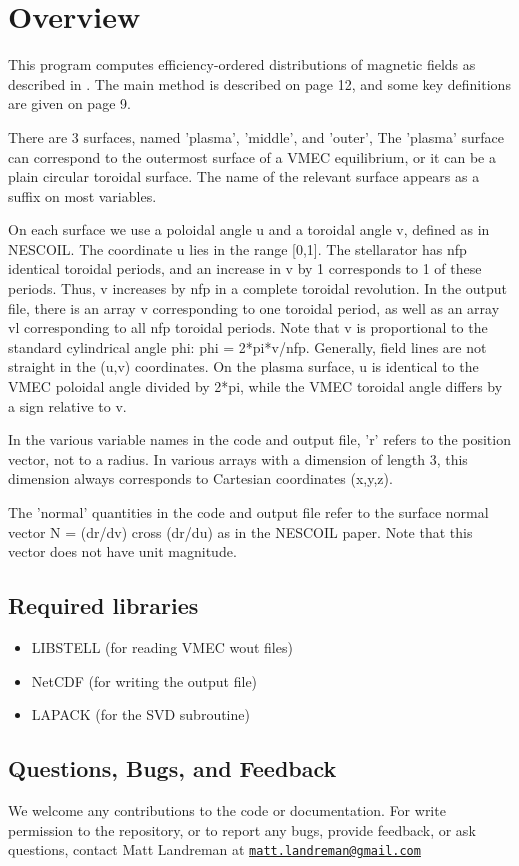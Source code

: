\chapter{Overview}

This program computes efficiency-ordered distributions of magnetic fields as described in \cite{boozer2015}.  The main method is described on page 12, and some key definitions are given on page 9.

There are 3 surfaces, named 'plasma', 'middle', and 'outer', The 'plasma' surface can correspond to the outermost surface of a VMEC equilibrium, or it can be a plain circular toroidal surface. The name of the relevant surface appears as a suffix on
most variables.

On each surface we use a poloidal angle u and a toroidal angle v, defined as in NESCOIL.  The coordinate u lies in the range [0,1]. The stellarator has nfp identical toroidal periods, and an increase in v by 1 corresponds to 1 of these periods. Thus,
v increases by nfp in a complete toroidal revolution. In the output file, there is an array v corresponding to one toroidal period, as well as an array vl corresponding to all nfp toroidal periods.  Note that v is proportional to the standard
cylindrical angle phi: phi = 2*pi*v/nfp.  Generally, field lines are not straight in the (u,v) coordinates.  On the plasma surface, u is identical to the VMEC poloidal angle divided by 2*pi, while the VMEC toroidal angle differs by a sign relative to
v.

In the various variable names in the code and output file, 'r' refers to the position vector, not to a radius.  In various arrays with a dimension of length 3, this dimension always corresponds to Cartesian coordinates (x,y,z).

The 'normal' quantities in the code and output file refer to the surface normal vector N = (dr/dv) cross (dr/du) as in the NESCOIL paper. Note that this vector does not have unit magnitude.



\section{Required libraries}

\begin{itemize}

\item LIBSTELL (for reading VMEC wout files)
\item NetCDF (for writing the output file)
\item LAPACK (for the SVD subroutine)
\end{itemize}

\section{Questions, Bugs, and Feedback}

We welcome any contributions to the code or documentation.
For write permission to the repository, or to report any bugs, provide feedback, or ask questions, contact Matt Landreman at
\href{mailto:matt.landreman@gmail.com}{\nolinkurl{matt.landreman@gmail.com} }






